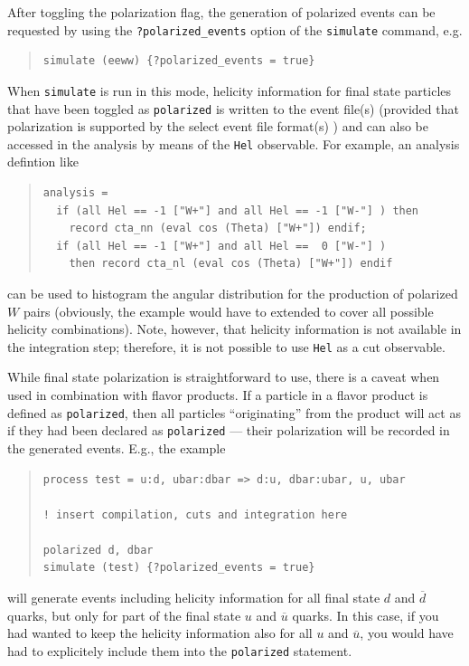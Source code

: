 \documentclass[12pt]{book}
\newcommand{\ttt}[1]{\texttt{#1}}
\begin{document}
After toggling the polarization flag, the generation of polarized events can be
requested by using the \ttt{?polarized\_events} option of the \ttt{simulate}
command, e.g.
\begin{quote}
\begin{footnotesize}
\begin{verbatim}
simulate (eeww) {?polarized_events = true}
\end{verbatim}
\end{footnotesize}
\end{quote}
When \ttt{simulate} is run in this mode, helicity information for final state
particles that have been toggled as \ttt{polarized} is written to the event
file(s) (provided that polarization is supported by the select event file
format(s) ) and can also be accessed in the analysis by means of the \ttt{Hel}
observable. For example, an analysis defintion like
\begin{quote}
\begin{footnotesize}
\begin{verbatim}
analysis =
  if (all Hel == -1 ["W+"] and all Hel == -1 ["W-"] ) then
    record cta_nn (eval cos (Theta) ["W+"]) endif;
  if (all Hel == -1 ["W+"] and all Hel ==  0 ["W-"] )
    then record cta_nl (eval cos (Theta) ["W+"]) endif
\end{verbatim}
\end{footnotesize}
\end{quote}
can be used to histogram the angular distribution for the production of
polarized $W$ pairs (obviously, the example would have to extended to cover all
possible helicity combinations). Note, however, that helicity information is not
available in the integration step; therefore, it is not possible to use
\ttt{Hel} as a cut observable.

While final state polarization is straightforward to use, there is a caveat when
used in combination with flavor products. If a particle in a flavor product is
defined as \ttt{polarized}, then all particles ``originating'' from the product will
act as if they had been declared as \ttt{polarized} --- their polarization will
be recorded in the generated events. E.g., the example
\begin{quote}
\begin{footnotesize}
\begin{verbatim}
process test = u:d, ubar:dbar => d:u, dbar:ubar, u, ubar

! insert compilation, cuts and integration here

polarized d, dbar
simulate (test) {?polarized_events = true}
\end{verbatim}
\end{footnotesize}
\end{quote}
will generate events including helicity information for all final state $d$ and
$\overline{d}$ quarks, but only for part of the final state $u$ and $\overline{u}$
quarks. In this case, if you had wanted to keep the helicity information also
for all $u$ and $\overline{u}$, you would have had to explicitely include them
into the \ttt{polarized} statement.
\end{document}
